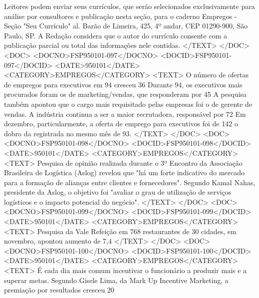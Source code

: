 Leitores podem enviar seus currículos, que serão selecionados exclusivamente para análise por consultores e publicação nesta seção, para o caderno Empregos - Seção "Seu Currículo" al. Barão de Limeira, 425, 4º andar, CEP 01290-900, São Paulo, SP. A Redação considera que o autor do currículo consente com a publicação parcial ou total das informações nele contidas.
</TEXT>
</DOC>
<DOC>
<DOCNO>FSP950101-097</DOCNO>
<DOCID>FSP950101-097</DOCID>
<DATE>950101</DATE>
<CATEGORY>EMPREGOS</CATEGORY>
<TEXT>
O número de ofertas de empregos para executivos em 94 cresceu 36%
Durante 94, os executivos mais procurados foram os de marketing/vendas, que responderam por 45%
A pesquisa também apontou que o cargo mais requisitado pelas empresas foi o de gerente de vendas. A indústria continua a ser a maior recrutadora, responsável por 72%
Em dezembro, particularmente, a oferta de emprego para executivos foi de 142 o dobro da registrada no mesmo mês de 93. 
</TEXT>
</DOC>
<DOC>
<DOCNO>FSP950101-098</DOCNO>
<DOCID>FSP950101-098</DOCID>
<DATE>950101</DATE>
<CATEGORY>EMPREGOS</CATEGORY>
<TEXT>
Pesquisa de opinião realizada durante o 3º Encontro da Associação Brasileira de Logística (Aslog) revelou que "há um forte indicativo do mercado para a formação de alianças entre clientes e fornecedores". Segundo Kamal Nahas, presidente da Aslog, o objetivo foi "avaliar o grau de utilização de serviços logísticos e o impacto potencial do negócio". 
</TEXT>
</DOC>
<DOC>
<DOCNO>FSP950101-099</DOCNO>
<DOCID>FSP950101-099</DOCID>
<DATE>950101</DATE>
<CATEGORY>EMPREGOS</CATEGORY>
<TEXT>
Pesquisa da Vale Refeição em 768 restaurantes de 30 cidades, em novembro, apontou aumento de 7,4%
</TEXT>
</DOC>
<DOC>
<DOCNO>FSP950101-100</DOCNO>
<DOCID>FSP950101-100</DOCID>
<DATE>950101</DATE>
<CATEGORY>EMPREGOS</CATEGORY>
<TEXT>
É cada dia mais comum incentivar o funcionário a produzir mais e a superar metas. Segundo Gisele Lima, da Mark Up Incentive Marketing, a premiação por resultados cresceu 20%
